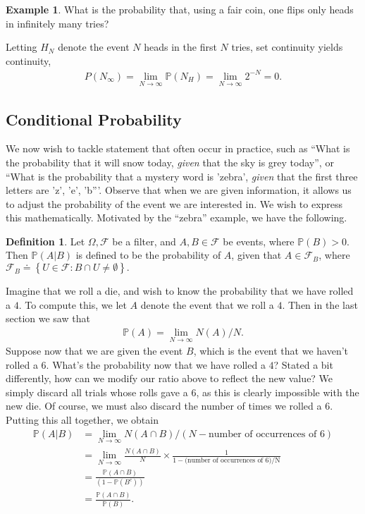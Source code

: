 \documentclass[12pt]{article}
\newcommand{\filter}{\mathcal{F}}
\newcommand{\prob}{\mathbb{P}}
\theoremstyle{plain}
\theoremstyle{definition}
\newtheorem*{definition}{Definition}
\newtheorem*{example}{Example}
\theoremstyle{remark}
\numberwithin{equation}{section}  %
\begin{document}
\begin{example}What is the probability that, using a fair coin, one
flips only heads in infinitely many tries? 
\end{example}
Letting $H_N$ denote the event
$N$ heads in the first $N$ tries, set continuity yields
continuity,
\begin{align*}
P(N_\infty) = \lim_{N \to \infty} \prob(N_H) = \lim_{N \to \infty} 2^{-N} = 0.
\end{align*}
\subsection{Conditional Probability}
We now wish to tackle statement that often occur in practice,
such as ``What is the probability that it will snow today, \emph{given}
that the sky is grey today'', or ``What is the probability that a mystery word
is 'zebra', \emph{given} that the first three letters are 'z', 'e', 'b'''.
Observe that when we are given information, it allows us to adjust the
probability of the event we are interested in. We wish to express this
mathematically. Motivated by the ``zebra'' example, we have the following.
\begin{definition}
Let $\Omega, \filter$ be a filter, and $A, B \in \filter$ be events, where
$\prob(B) > 0$. Then $\prob(A | B)$ is defined to be the probability of $A$, given that $A \in \filter_B$, where $\filter_B
\doteq \left\{ U \in \filter: B \cap U \neq \emptyset \right\}.$
\end{definition}
Imagine that we roll a die, and wish to know the probability that
we have rolled a $4$.
To compute this, we let $A$ denote the event that we roll a $4$. Then in the last section we saw
that
\begin{align*}
\prob(A) = \lim_{N \to \infty} N(A)/N.
\end{align*}
Suppose now that we are given the event $B$, which is the event that we haven't
rolled a $6$.
What's the probability now that we have rolled a $4$?
Stated a bit differently, how can we modify our ratio above to reflect the
new value? We simply discard all trials whose rolls gave a $6$, as this is clearly
impossible with the new die. Of course, we must also discard the number of times
we rolled a $6$. Putting this all together, we obtain
\begin{align*}
\prob(A | B) & = \lim_{N \to \infty} N(A \cap B)/(N -
\text{number of occurrences of $6$})
\\
& = \lim_{N \to \infty} \frac{N(A \cap B)}{N} \times \frac{1}{1 - (\text{number
of occurrences of $6$)/N}}
\\
& = \frac{\prob(A \cap B)}{(1 - \prob(B^c))}
\\
& = \frac{\prob(A \cap B)}{\prob(B)}.
\end{align*}
\end{document}
